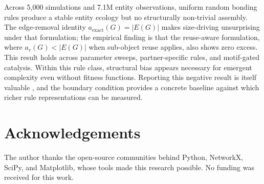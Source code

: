 \documentclass[letterpaper]{article}
\begin{document}
Across 5{,}000 simulations and 7.1M entity observations, uniform random
bonding rules produce a stable entity ecology but no structurally
non-trivial assembly. The edge-removal identity
$a_{\text{exact}}(G) = |E(G)|$ makes size-driving unsurprising under
that formulation; the empirical finding is that the reuse-aware
formulation, where $a_r(G) < |E(G)|$ when sub-object reuse applies,
also shows zero excess. This result holds across parameter sweeps,
partner-specific rules, and motif-gated catalysis. Within this rule
class, structural bias appears necessary for emergent complexity even
without fitness functions. Reporting this negative result is itself
valuable \citep{fanelli2012negativeresults}, and the boundary condition
provides a concrete baseline against which richer rule representations
can be measured.


\section*{Acknowledgements}

The author thanks the open-source communities behind Python, NetworkX,
SciPy, and Matplotlib, whose tools made this research possible.
No funding was received for this work.


\footnotesize


\end{document}

